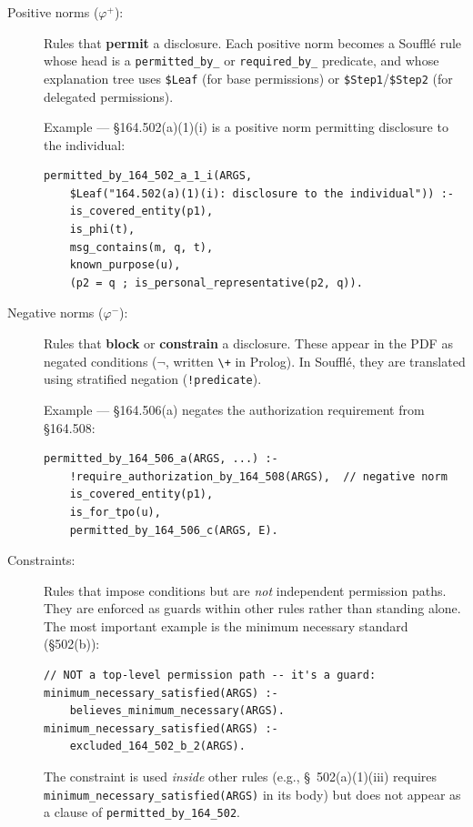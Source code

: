 \documentclass[11pt,letterpaper]{article}
\begin{document}
\begin{description}
  \item[Positive norms ($\varphi^+$):] Rules that \textbf{permit} a disclosure. Each positive norm becomes a Souffl\'{e} rule whose head is a \texttt{permitted\_by\_} or \texttt{required\_by\_} predicate, and whose explanation tree uses \texttt{\$Leaf} (for base permissions) or \texttt{\$Step1}/\texttt{\$Step2} (for delegated permissions).

  Example --- \S 164.502(a)(1)(i) is a positive norm permitting disclosure to the individual:
\begin{lstlisting}[style=soufflestyle]
permitted_by_164_502_a_1_i(ARGS,
    $Leaf("164.502(a)(1)(i): disclosure to the individual")) :-
    is_covered_entity(p1),
    is_phi(t),
    msg_contains(m, q, t),
    known_purpose(u),
    (p2 = q ; is_personal_representative(p2, q)).
\end{lstlisting}

  \item[Negative norms ($\varphi^-$):] Rules that \textbf{block} or \textbf{constrain} a disclosure. These appear in the PDF as negated conditions ($\neg$, written \texttt{\textbackslash+} in Prolog). In Souffl\'{e}, they are translated using stratified negation (\texttt{!predicate}).

  Example --- \S 164.506(a) negates the authorization requirement from \S 164.508:
\begin{lstlisting}[style=soufflestyle]
permitted_by_164_506_a(ARGS, ...) :-
    !require_authorization_by_164_508(ARGS),  // negative norm
    is_covered_entity(p1),
    is_for_tpo(u),
    permitted_by_164_506_c(ARGS, E).
\end{lstlisting}

  \item[Constraints:] Rules that impose conditions but are \emph{not} independent permission paths. They are enforced as guards within other rules rather than standing alone. The most important example is the minimum necessary standard (\S 502(b)):
\begin{lstlisting}[style=soufflestyle]
// NOT a top-level permission path -- it's a guard:
minimum_necessary_satisfied(ARGS) :-
    believes_minimum_necessary(ARGS).
minimum_necessary_satisfied(ARGS) :-
    excluded_164_502_b_2(ARGS).
\end{lstlisting}

  The constraint is used \emph{inside} other rules (e.g., \S~502(a)(1)(iii) requires \texttt{minimum\_necessary\_satisfied\allowbreak{}(ARGS)} in its body) but does not appear as a clause of \texttt{permitted\_by\_\allowbreak{}164\_502}.
\end{description}
\end{document}
